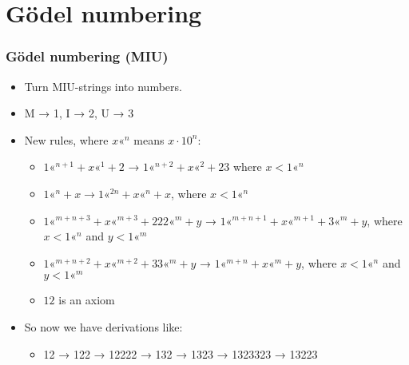 \documentclass[mathserif]{beamer}
\newcommand{\shl}[1]{\text{«}^{#1}}
\begin{document}
\section{Gödel numbering}
\label{sec-3}
\begin{frame}
\frametitle{Gödel numbering (MIU)}
\label{sec-3-1}
\begin{itemize}

\item Turn MIU-strings into numbers.\\
\label{sec-3-1-1}%
\item M → 1, I → 2, U → 3\\
\label{sec-3-1-2}%
\item New rules, where $x\shl{n}$ means $x\cdot 10^n$:
\label{sec-3-1-3}%
\begin{itemize}

\item $1\shl{n+1} + x\shl{1} + 2$ → $1\shl{n+2} + x\shl{2} + 23$ where $x < 1\shl{n}$\\
\label{sec-3-1-3-1}%
\item $1\shl{n} + x → 1\shl{2n} + x\shl{n} + x$, where $x < 1\shl{n}$\\
\label{sec-3-1-3-2}%
\item $1\shl{m+n+3} + x\shl{m+3} + 222\shl{m} + y$ → $1\shl{m+n+1} + x\shl{m+1} + 3\shl{m} + y$, where $x < 1\shl{n}$ and $y < 1\shl{m}$\\
\label{sec-3-1-3-3}%
\item $1\shl{m+n+2} + x\shl{m+2} + 33\shl{m} + y$ → $1\shl{m+n} + x\shl{m} + y$, where $x < 1\shl{n}$ and $y < 1\shl{m}$\\
\label{sec-3-1-3-4}%
\item $12$ is an axiom\\
\label{sec-3-1-3-5}%
\end{itemize} %

\item So now we have derivations like:
\label{sec-3-1-4}%
\begin{itemize}

\item 12 → 122 → 12222 → 132 → 1323 → 1323323 → 13223\\
\label{sec-3-1-4-1}%
\end{itemize} %
\end{itemize} %
\end{frame}
\end{document}
